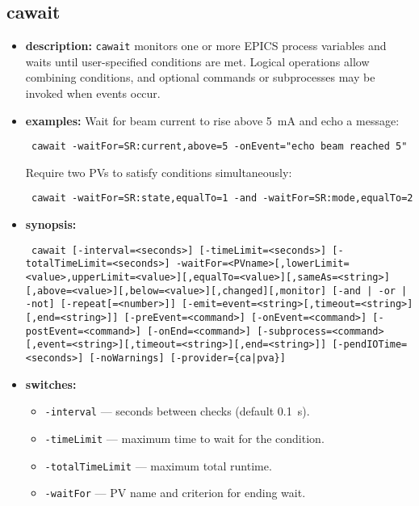 \begin{latexonly}
\newpage
\end{latexonly}

\subsection{cawait}
\label{cawait}

\begin{itemize}
\item {\bf description:}
\verb+cawait+ monitors one or more EPICS process variables and waits until
user-specified conditions are met. Logical operations allow combining
conditions, and optional commands or subprocesses may be invoked when
events occur.
\item {\bf examples:}
Wait for beam current to rise above 5~mA and echo a message:
\begin{flushleft}{\tt
cawait -waitFor=SR:current,above=5 -onEvent="echo beam reached 5"
}\end{flushleft}
Require two PVs to satisfy conditions simultaneously:
\begin{flushleft}{\tt
cawait -waitFor=SR:state,equalTo=1 -and -waitFor=SR:mode,equalTo=2
}\end{flushleft}
\item {\bf synopsis:}
\begin{flushleft}{\tt
cawait [-interval=<seconds>] [-timeLimit=<seconds>] [-totalTimeLimit=<seconds>]\
 -waitFor=<PVname>[,lowerLimit=<value>,upperLimit=<value>][,equalTo=<value>][,sameAs=<string>][,above=<value>][,below=<value>][,changed][,monitor]\
 [{-and | -or | -not}]\
 [-repeat[=<number>]]\
 [-emit=event=<string>[,timeout=<string>][,end=<string>]]\
 [-preEvent=<command>]\
 [-onEvent=<command>]\
 [-postEvent=<command>]\
 [-onEnd=<command>]\
 [-subprocess=<command>[,event=<string>][,timeout=<string>][,end=<string>]]\
 [-pendIOTime=<seconds>]\
 [-noWarnings]\
 [-provider=\{ca|pva\}]
}\end{flushleft}
\item {\bf switches:}
  \begin{itemize}
  \item {\tt -interval} --- seconds between checks (default 0.1~s).
  \item {\tt -timeLimit} --- maximum time to wait for the condition.
  \item {\tt -totalTimeLimit} --- maximum total runtime.
  \item {\tt -waitFor} --- PV name and criterion for ending wait.

\end{itemize}
\end{itemize}
